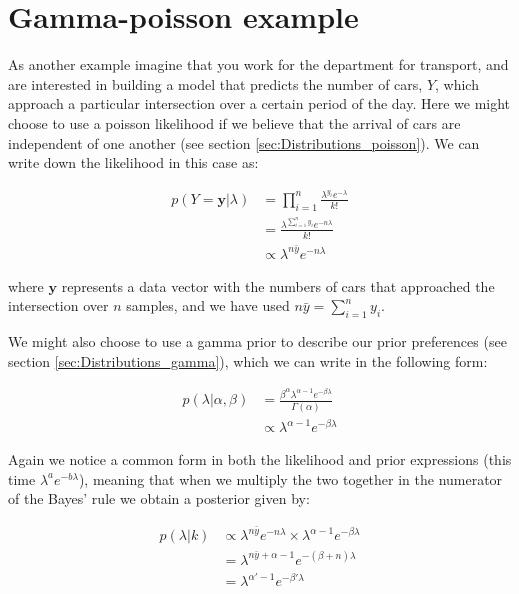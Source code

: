 \documentclass[11pt,fullpage]{book}
\begin{document}
\section{Gamma-poisson example}
As another example imagine that you work for the department for transport, and are interested in building a model that predicts the number of cars, $Y$, which approach a particular intersection over a certain period of the day. Here we might choose to use a poisson likelihood if we believe that the arrival of cars are independent of one another (see section \ref{sec:Distributions_poisson}). We can write down the likelihood in this case as:

\begin{equation}
\begin{align}
p(Y=\boldsymbol{y}|\lambda) &= \prod\limits_{i=1}^{n} \frac{\lambda^{y_i} e^{-\lambda}}{k!}\\
&= \frac{\lambda^{\sum\limits_{i=1}^{n}y_i} e^{-n\lambda}}{k!}\\
&\propto \lambda^{n \bar{y}} e^{-n\lambda}
\end{align}
\end{equation}

where $\boldsymbol{y}$ represents a data vector with the numbers of cars that approached the intersection over $n$ samples, and we have used $n \bar{y} = \sum\limits_{i=1}^{n}y_i$.

We might also choose to use a gamma prior to describe our prior preferences (see section \ref{sec:Distributions_gamma}), which we can write in the following form:

\begin{equation}\label{eq:Conjugate_gammaPrior}
\begin{align}
p(\lambda|\alpha,\beta) &= \frac{\beta^\alpha \lambda^{\alpha-1} e^{-\beta \lambda}}{\Gamma(\alpha)}\\
&\propto \lambda^{\alpha-1} e^{-\beta \lambda}
\end{align}
\end{equation}

Again we notice a common form in both the likelihood and prior expressions (this time $\lambda^a e^{-b \lambda}$), meaning that when we multiply the two together in the numerator of the Bayes' rule we obtain a posterior given by:

\begin{equation}
\begin{align}
p(\lambda|k) &\propto \lambda^{n \bar{y}} e^{-n\lambda} \times \lambda^{\alpha-1} e^{-\beta \lambda}\\
&= \lambda^{n \bar{y} + \alpha-1} e^{-(\beta+n) \lambda}\\
&= \lambda^{\alpha'-1} e^{-\beta' \lambda}
\end{align}
\end{equation}
\end{document}
